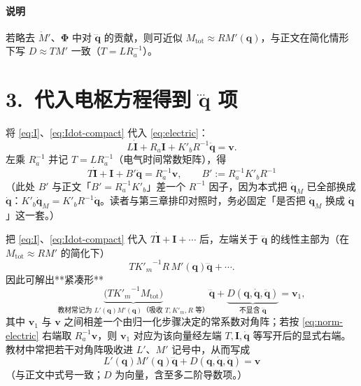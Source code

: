 \documentclass[UTF8,a4paper,12pt]{ctexart}
\begin{document}
\paragraph{说明} 若略去 $\dot M'$、$\bm{\Phi}$ 中对 $\dddot{\bm{q}}$ 的贡献，则可近似 $M_{\mathrm{tot}}\approx R M'(\bm{q})$，与正文在简化情形下写 $D\approx T M'$ 一致（$T=LR_a^{-1}$）。

\section*{3.\ 代入电枢方程得到 $\dddot{\bm{q}}$ 项}

将 \eqref{eq:I}、\eqref{eq:Idot-compact} 代入 \eqref{eq:electric}：
\begin{equation}
L\dot{\bm{I}}+R_a\bm{I}+K'_b R^{-1}\dot{\bm{q}}=\bm{v}.
\end{equation}
左乘 $R_a^{-1}$ 并记 $T=LR_a^{-1}$（电气时间常数矩阵），得
\begin{equation}
T\dot{\bm{I}}+\bm{I}+B'\dot{\bm{q}}=R_a^{-1}\bm{v},\qquad B':=R_a^{-1}K'_bR^{-1}
\label{eq:norm-electric}
\end{equation}
（此处 $B'$ 与正文「$B'=R_a^{-1}K'_b$」差一个 $R^{-1}$ 因子，因为本式把 $\dot{\bm{q}}_M$ 已全部换成 $\dot{\bm{q}}$：$K'_b\dot{\bm{q}}_M=K'_bR^{-1}\dot{\bm{q}}$。读者与第三章排印对照时，务必固定「是否把 $\dot{\bm{q}}_M$ 换成 $\dot{\bm{q}}$」这一套。）

把 \eqref{eq:I}、\eqref{eq:Idot-compact} 代入 $T\dot{\bm{I}}+\bm{I}+\cdots$ 后，左端关于 $\dddot{\bm{q}}$ 的线性主部为（在 $M_{\mathrm{tot}}\approx R M'$ 的简化下）
\begin{equation}
T{K'_m}^{-1}R\,M'(\bm{q})\dddot{\bm{q}}+\cdots .
\end{equation}
因此可解出**紧凑形**
\begin{equation}
\underbrace{\bigl(T{K'_m}^{-1}M_{\mathrm{tot}}\bigr)}_{\text{教材常记为 }L'(\bm{q})M'(\bm{q})\text{（吸收 }T,K'_m,R\text{ 等）}}\dddot{\bm{q}}
+\underbrace{D(\bm{q},\dot{\bm{q}},\ddot{\bm{q}})}_{\text{不显含 }\dddot{\bm{q}}}
=\bm{v}_1 ,
\label{eq:compact-third}
\end{equation}
其中 $\bm{v}_1$ 与 $\bm{v}$ 之间相差一个由归一化步骤决定的常系数对角阵；若按 \eqref{eq:norm-electric} 右端取 $R_a^{-1}\bm{v}$，则 $\bm{v}_1$ 对应为该向量经左端 $T,\bm{I},\dot{\bm{q}}$ 等写开后的显式右端。教材中常把若干对角阵吸收进 $L'$、$M'$ 记号中，从而写成
\begin{equation}
\boxed{ \; L'(\bm{q})M'(\bm{q})\dddot{\bm{q}}+D(\bm{q},\dot{\bm{q}},\ddot{\bm{q}})=\bm{v} \;}
\label{eq:boxed-LMp}
\end{equation}
（与正文中式号一致；$D$ 为向量，含至多二阶导数项。）
\end{document}
